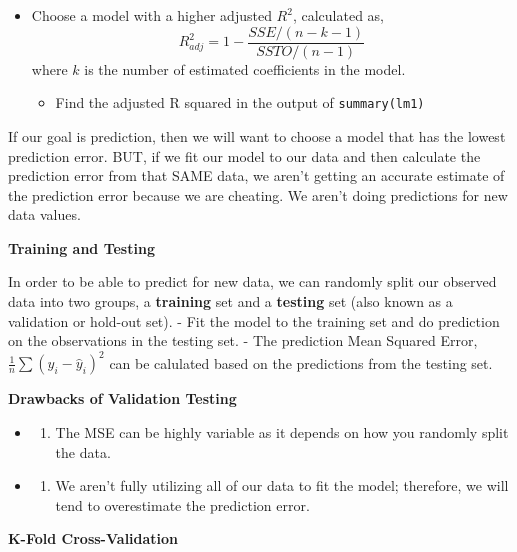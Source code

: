 \documentclass[]{book}
\providecommand{\tightlist}{%
  \setlength{\itemsep}{0pt}\setlength{\parskip}{0pt}}
\begin{document}
\begin{itemize}
\tightlist
\item
  Choose a model with a higher adjusted \(R^2\), calculated as,
  \[R^2_{adj} = 1 - \frac{SSE/(n-k-1)}{SSTO/(n-1)}\]
  where \(k\) is the number of estimated coefficients in the model.

  \begin{itemize}
  \tightlist
  \item
    Find the adjusted R squared in the output of \texttt{summary(lm1)}
  \end{itemize}
\end{itemize}

If our goal is prediction, then we will want to choose a model that has the lowest prediction error. BUT, if we fit our model to our data and then calculate the prediction error from that SAME data, we aren't getting an accurate estimate of the prediction error because we are cheating. We aren't doing predictions for new data values.

\textbf{Training and Testing}

In order to be able to predict for new data, we can randomly split our observed data into two groups, a \textbf{training} set and a \textbf{testing} set (also known as a validation or hold-out set).
- Fit the model to the training set and do prediction on the observations in the testing set.
- The prediction Mean Squared Error, \(\frac{1}{n}\sum(y_i - \hat{y}_i)^2\) can be calulated based on the predictions from the testing set.

\textbf{Drawbacks of Validation Testing}

\begin{itemize}
\item
  \begin{enumerate}
  \def\labelenumi{\arabic{enumi})}
  \tightlist
  \item
    The MSE can be highly variable as it depends on how you randomly split the data.
  \end{enumerate}
\item
  \begin{enumerate}
  \def\labelenumi{\arabic{enumi})}
  \setcounter{enumi}{1}
  \tightlist
  \item
    We aren't fully utilizing all of our data to fit the model; therefore, we will tend to overestimate the prediction error.
  \end{enumerate}
\end{itemize}

\textbf{K-Fold Cross-Validation}
\end{document}
